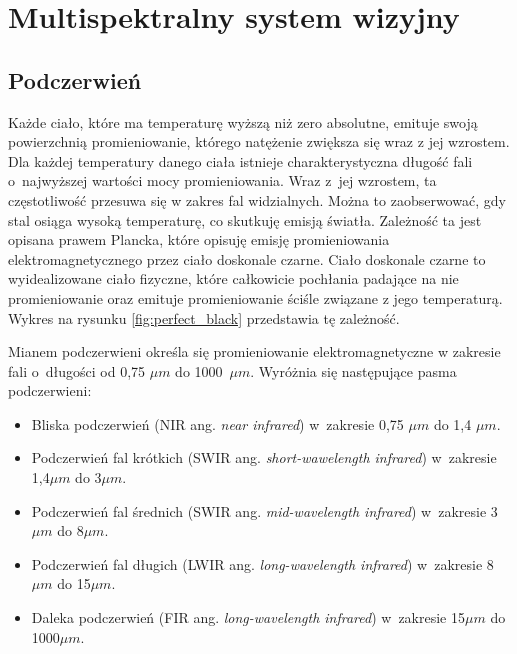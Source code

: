 \chapter{Multispektralny system wizyjny}
\label{cha:multispectral}



 
\section{Podczerwień}

Każde ciało, które ma temperaturę wyższą niż zero absolutne, emituje swoją powierzchnią promieniowanie, którego natężenie zwiększa się wraz z jej wzrostem.
Dla każdej temperatury danego ciała istnieje charakterystyczna długość fali o~najwyższej wartości mocy promieniowania. 
Wraz z~jej wzrostem, ta częstotliwość przesuwa się w zakres fal widzialnych.
Można to zaobserwować, gdy stal osiąga wysoką temperaturę, co skutkuję emisją światła.
Zależność ta jest opisana prawem Plancka, które opisuję emisję promieniowania elektromagnetycznego przez ciało doskonale czarne.
Ciało doskonale czarne to wyidealizowane ciało fizyczne, które całkowicie pochłania padające na nie promieniowanie oraz emituje promieniowanie ściśle związane z jego temperaturą.
Wykres na rysunku \ref{fig:perfect_black} przedstawia tę zależność.

Mianem podczerwieni określa się promieniowanie elektromagnetyczne w zakresie fali o~długości od 0,75 $\mu m$ do 1000~$\mu m$. Wyróżnia się następujące pasma podczerwieni:
\begin{itemize}
\item Bliska podczerwień (NIR ang. \textit{near infrared}) w~zakresie 0,75 $\mu m$ do 1,4 $\mu m$.
\item Podczerwień fal krótkich (SWIR ang. \textit{short-wawelength infrared}) w~zakresie 1,4$\mu m$ do 3$\mu m$.
\item Podczerwień fal średnich (SWIR ang. \textit{mid-wavelength infrared}) w~zakresie 3$\mu m$ do 8$\mu m$.
\item Podczerwień fal długich (LWIR ang. \textit{long-wavelength infrared}) w~zakresie 8$\mu m$ do 15$\mu m$.
\item Daleka podczerwień (FIR ang. \textit{long-wavelength infrared}) w~zakresie 15$\mu m$ do 1000$\mu m$.
\end{itemize}

